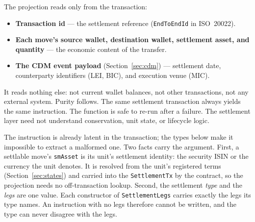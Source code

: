 The projection reads only from the transaction:
\begin{itemize}[nosep]
\item \textbf{Transaction id} --- the settlement reference (\texttt{EndToEndId} in ISO~20022).
\item \textbf{Each move's source wallet, destination wallet, settlement asset, and quantity} --- the economic content of the transfer.
\item \textbf{The CDM event payload} (Section~\ref{sec:cdm}) --- settlement date, counterparty identifiers (LEI, BIC), and execution venue (MIC).
\end{itemize}

It reads nothing else: not current wallet balances, not other transactions, not any external system. Purity follows. The same settlement transaction always yields the same instruction. The function is safe to re-run after a failure. The settlement layer need not understand conservation, unit state, or lifecycle logic.

The instruction is already latent in the transaction; the types below make it impossible to extract a malformed one. Two facts carry the argument. First, a settlable move's \texttt{smAsset} is its unit's settlement identity: the security ISIN or the currency the unit denotes. It is resolved from the unit's registered terms (Section~\ref{sec:states}) and carried into the \texttt{SettlementTx} by the contract, so the projection needs no off-transaction lookup. Second, the settlement \emph{type} and the \emph{legs} are one value. Each constructor of \texttt{SettlementLegs} carries exactly the legs its type names. An instruction with no legs therefore cannot be written, and the type can never disagree with the legs.

